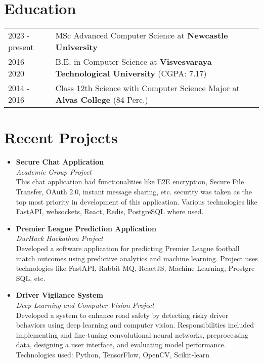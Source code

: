 \documentclass[a4paper,12pt]{article}
\begin{document}
\section{Education}
\begin{tabularx}{\linewidth}{@{}l X@{}} 
2023 - present & MSc Advanced Computer Science at \textbf{Newcastle University} \hfill \normalsize  \\
2016 - 2020 & B.E. in Computer Science at \textbf{Visvesvaraya Technological University} \hfill (CGPA: 7.17) \\
2014 - 2016 & Class 12th Science with Computer Science Major at \textbf{Alvas College} \hfill  (84 Perc.) \\
\end{tabularx}

\section{Recent Projects}
\begin{itemize}[leftmargin=*]
    \item \textbf{Secure Chat Application} \\
    \textit{Academic Group Project} \\
    This chat application had functionalities like E2E encryption, Secure File Transfer, OAuth 2.0, instant message sharing, etc. security was taken as the top most priority in development of this application. Various technologies like FastAPI, websockets, React, Redis, PostgreSQL where used.
    \item \textbf{Premier League Prediction Application} \\
    \textit{DurHack Hackathon Project} \\
    Developed a software application for predicting Premier League football match outcomes using predictive analytics and machine learning. Project uses technologies like FastAPI, Rabbit MQ, ReactJS, Machine Learning, Prostgre SQL, etc.
    \item \textbf{Driver Vigilance System} \\
    \textit{Deep Learning and Computer Vision Project} \\
    Developed a system to enhance road safety by detecting risky driver behaviors using deep learning and computer vision. Responsibilities included implementing and fine-tuning convolutional neural networks, preprocessing data, designing a user interface, and evaluating model performance. Technologies used: Python, TensorFlow, OpenCV, Scikit-learn
\end{itemize}
\end{document}

